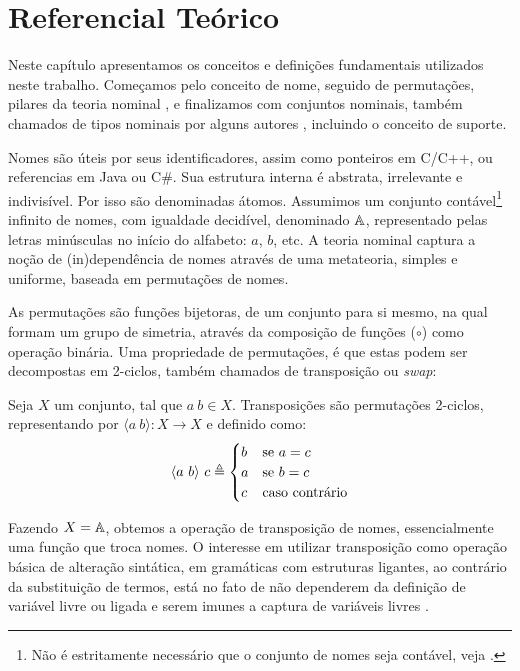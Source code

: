 \chapter{Referencial Teórico}\label{chp:ref-teorico}

Neste capítulo apresentamos os conceitos e definições fundamentais utilizados neste trabalho. Começamos pelo conceito de nome, seguido de permutações, pilares da teoria nominal \cite{Gabbay2002,Pitts2003,Pitts2013}, e finalizamos com conjuntos nominais, também chamados de tipos nominais por alguns autores \cite{Urban2008,Choudhury2015}, incluindo o conceito de suporte.

Nomes são úteis por seus identificadores, assim como ponteiros em C/C++, ou referencias em Java ou C\#. Sua estrutura interna é abstrata, irrelevante e indivisível. Por isso são denominadas átomos. Assumimos um conjunto contável\footnote{Não é estritamente necessário que o conjunto de nomes seja contável, veja \cite[Exercício 6.2, página 109]{Pitts2013}.} infinito de nomes, com igualdade decidível, denominado $\mathbb{A}$, representado pelas letras minúsculas no início do alfabeto: $a$, $b$, etc. A teoria nominal captura a noção de (in)dependência de nomes através de uma metateoria, simples e uniforme, baseada em permutações de nomes.

As permutações são funções bijetoras, de um conjunto para si mesmo, na qual formam um grupo de simetria, através da composição de funções ($\circ$) como operação binária. Uma propriedade de permutações, é que estas podem ser decompostas em 2-ciclos, também chamados de transposição ou \textit{swap}:
\begin{definicao}\label{def:swap}
	Seja $X$ um conjunto, tal que $a~b \in X$. Transposições são permutações 2-ciclos, representando por $\langle a~b \rangle : X \rightarrow X$ e definido como:
	\begin{equation}
		\langle a~b \rangle ~c \triangleq 
		\begin{cases}
			b & \text{\normalfont se } a = c \\
			a & \text{\normalfont se } b = c \\
			c & \text{\normalfont caso contrário}
		\end{cases}
	\end{equation} 
\end{definicao}\noindent
Fazendo $X = \mathbb{A}$, obtemos a operação de transposição de nomes, essencialmente uma função que troca nomes. O interesse em utilizar transposição como operação básica de alteração sintática, em gramáticas com estruturas ligantes, ao contrário da substituição de termos, está no fato de não dependerem da definição de variável livre ou ligada e serem imunes a captura de variáveis livres \cite{Pitts2003}. 

